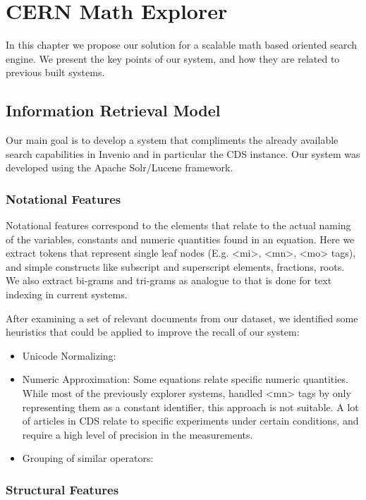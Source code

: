 \chapter{CERN Math Explorer}
\label{chapter-cern_math_explorer}
In this chapter we propose our solution for a scalable math based oriented search engine. We present the key points of our system, and how they are related to previous built systems.

\section{Information Retrieval Model}
Our main goal is to develop a system that compliments the already available search capabilities in Invenio and in particular the CDS instance. Our system was developed using the Apache Solr/Lucene framework.


\subsection{Notational Features}
Notational features correspond to the elements that relate to the actual naming of the variables, constants and numeric quantities found in an equation. Here we extract tokens that represent single leaf nodes (E.g. <mi>, <mn>, <mo> tags), and simple constructs like subscript and superscript elements, fractions, roots.
We also extract bi-grams and tri-grams as analogue to that is done for text indexing in current systems.

After examining a set of relevant documents from our dataset, we identified some heuristics that could be applied to improve the recall of our system:

\begin{itemize}
  \item Unicode Normalizing:
  \item Numeric Approximation: Some equations relate specific numeric quantities. While most of the previously explorer systems, handled <mn> tags by only representing them as a constant identifier, this approach is not suitable. A lot of articles in CDS relate to specific experiments under certain conditions, and require a high level of precision in the measurements. 
  \item Grouping of similar operators:
\end{itemize}

\subsection{Structural Features}


